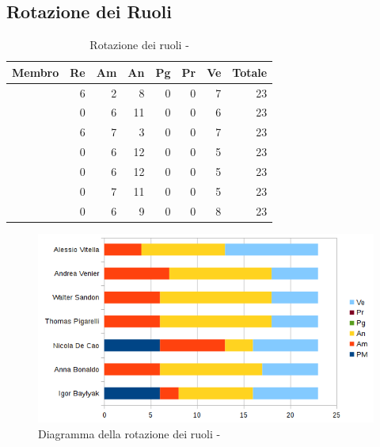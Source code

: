\documentclass[12pt,a4paper]{article}
\begin{document}
\newpage

\subsection{Rotazione dei Ruoli}

\begin{table}[H]
	\begin{center}
		\begin{tabular}{l r r r r r r r}
			\toprule
			\textbf{Membro}	&	\textbf{Re}	&	\textbf{Am}	& \textbf{An} & \textbf{Pg} & \textbf{Pr} & \textbf{Ve} & \textbf{Totale}\\
			\midrule
			\midrule
			\IB & 6 & 2 & 8 & 0 & 0 & 7 & 23 \\
			\midrule
			\AB & 0 & 6 & 11 & 0 & 0 & 6 & 23 \\
			\midrule
			\NDC & 6 & 7 & 3 & 0 & 0 & 7 & 23 \\
			\midrule
			\TP & 0 & 6 & 12 & 0 & 0 & 5 & 23 \\
			\midrule
			\WS & 0 & 6 & 12 & 0 & 0 & 5 & 23 \\
			\midrule
			\AVE & 0 & 7 & 11 & 0 & 0 & 5 & 23 \\
			\midrule
			\AVI & 0 & 6 & 9 & 0 & 0 & 8 & 23 \\
			\bottomrule
		\end{tabular}
		\caption{Rotazione dei ruoli - \FA}
	\end{center}
\end{table}

\begin{center}
	\begin{figure}[H]
		\centering
		\includegraphics[width=\textwidth]{diagrammaBarreAnalisiRotazioneRuoli.png}
		\caption{Diagramma della rotazione dei ruoli - \FA}
	\end{figure}
\end{center}
\end{document}
